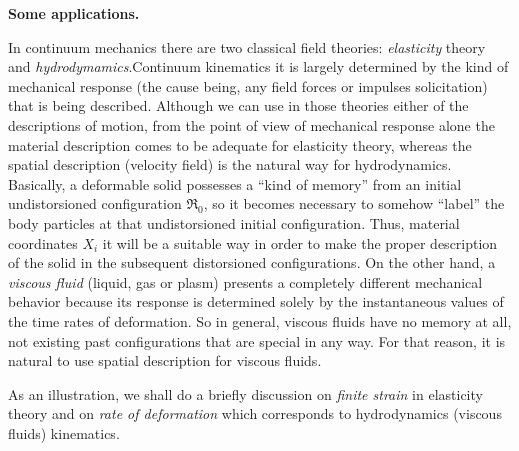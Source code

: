 \documentclass[12pt]{article}
\begin{document}
{\textbf{Some applications.}

In continuum mechanics there are two classical field theories: {\em elasticity} theory and {\em hydrodymamics}.Continuum kinematics it is largely determined by the kind of mechanical response (the cause being, any field forces or impulses solicitation) that is being described. Although we can use in those theories either of the descriptions of motion, from the point of view of mechanical response alone the material description comes to be adequate for elasticity theory, whereas the spatial description (velocity field) is the natural way 
for hydrodynamics. Basically, a deformable solid possesses a ``kind of memory'' 
from an initial undistorsioned configuration $\Re_0$, so it becomes necessary 
to somehow ``label'' the body particles at that undistorsioned initial configuration. Thus, material coordinates $X_i$ it will be a suitable way in order to make the proper description of the solid in the subsequent distorsioned configurations. On the other hand, a {\em viscous fluid} (liquid, gas or plasm) presents a completely different mechanical behavior   because its response is determined solely by the instantaneous values of the time rates of deformation. So in general, viscous fluids have no memory at all, not existing past configurations that are special in any way. For that reason, it is natural to use spatial description for viscous fluids.

As an illustration, we shall do a briefly discussion on {\em finite strain} in elasticity theory and on {\em rate of deformation} which corresponds to hydrodynamics (viscous fluids) kinematics.

}
\end{document}

